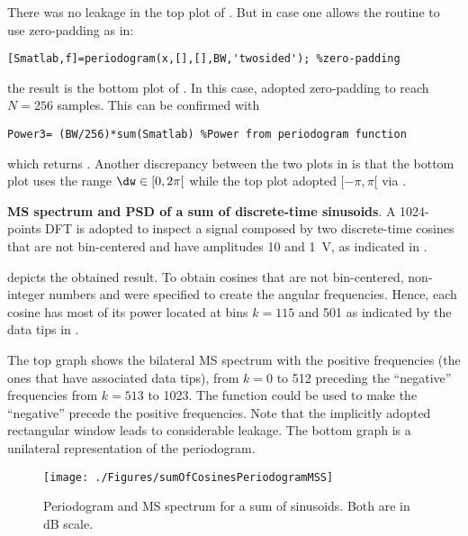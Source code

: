 There was no leakage in the top plot of . But in case one allows the  routine to use zero-padding as in:
\begin{lstlisting}
[Smatlab,f]=periodogram(x,[],[],BW,'twosided'); %zero-padding
\end{lstlisting}
the result is the bottom plot of . In this case,  adopted zero-padding to reach $N=256$ samples. This can be confirmed with
\begin{lstlisting}
Power3= (BW/256)*sum(Smatlab) %Power from periodogram function
\end{lstlisting}
which returns . Another discrepancy between the two plots in  is that the bottom plot uses the range $\dw \in [0, 2\pi[$ while the top plot adopted $[-\pi, \pi[$ via .
\eExample

\bExample \textbf{MS spectrum and PSD of a sum of discrete-time sinusoids}.
A 1024-points DFT is adopted to inspect a signal composed by two discrete-time cosines that are not bin-centered and have amplitudes 10 and 1~V, as indicated in .

 depicts the obtained result. To obtain cosines that are not bin-centered, non-integer numbers  and  were specified to create the angular frequencies. Hence, each cosine has most of its power located at bins $k=115$ and 501 as indicated by the data tips in .

The top graph shows the bilateral MS spectrum with the positive frequencies (the ones that have associated data tips), from $k=0$ to 512 preceding the ``negative'' frequencies from $k=513$ to 1023. The function  could be used to make the ``negative'' precede the positive frequencies.
Note that the implicitly adopted rectangular window leads to considerable leakage.
The bottom graph is a unilateral representation of the periodogram.

\begin{figure}[htbp]
\centering
\texttt{[image: ./Figures/sumOfCosinesPeriodogramMSS]}
\caption{Periodogram and MS spectrum for a sum of sinusoids. Both are in dB scale.\label{fig:sumOfCosinesPeriodogramMSS}}
\end{figure}

